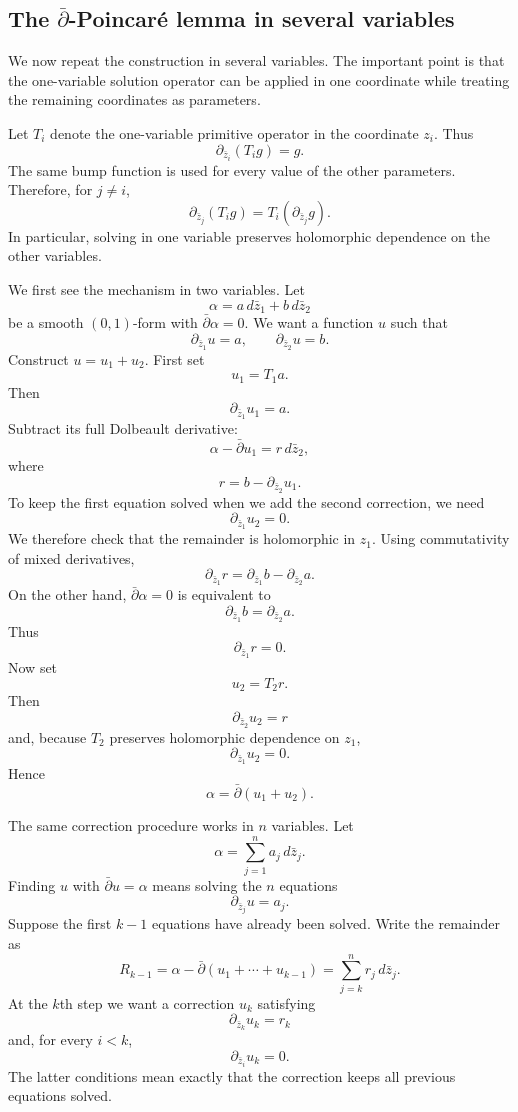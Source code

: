 \subsection{The $\bar\partial$-Poincaré lemma
in
several variables}
\label{subsection-dbar-poincare-several-variables}

\medskip\noindent
We now repeat the construction in several
variables. The important point is that the
one-variable solution operator can be
applied in one coordinate while treating
the remaining coordinates as parameters.

Let $T_i$ denote the one-variable primitive
operator in the coordinate $z_i$. Thus
$$
\partial_{\bar z_i}(T_i g)=g.
$$
The same bump function is used for every
value of the other parameters. Therefore,
for $j\neq i$,
$$
\partial_{\bar z_j}(T_i g)
=
T_i(\partial_{\bar z_j}g).
$$
In particular, solving in one variable
preserves holomorphic dependence on the
other variables.

We first see the mechanism in two variables.
Let
$$
\alpha
=
a\,d\bar z_1+b\,d\bar z_2
$$
be a smooth $(0,1)$-form with
$\bar\partial\alpha=0$. We want a function
$u$ such that
$$
\partial_{\bar z_1}u=a,
\qquad
\partial_{\bar z_2}u=b.
$$
Construct $u=u_1+u_2$. First set
$$
u_1=T_1a.
$$
Then
$$
\partial_{\bar z_1}u_1=a.
$$
Subtract its full Dolbeault derivative:
$$
\alpha-\bar\partial u_1
=
r\,d\bar z_2,
$$
where
$$
r
=
b-\partial_{\bar z_2}u_1.
$$
To keep the first equation solved when we
add the second correction, we need
$$
\partial_{\bar z_1}u_2=0.
$$
We therefore check that the remainder is
holomorphic in $z_1$. Using commutativity of
mixed derivatives,
$$
\partial_{\bar z_1}r
=
\partial_{\bar z_1}b
-
\partial_{\bar z_2}a.
$$
On the other hand,
$\bar\partial\alpha=0$ is equivalent to
$$
\partial_{\bar z_1}b
=
\partial_{\bar z_2}a.
$$
Thus
$$
\partial_{\bar z_1}r=0.
$$
Now set
$$
u_2=T_2r.
$$
Then
$$
\partial_{\bar z_2}u_2=r
$$
and, because $T_2$ preserves holomorphic
dependence on $z_1$,
$$
\partial_{\bar z_1}u_2=0.
$$
Hence
$$
\alpha=\bar\partial(u_1+u_2).
$$

The same correction procedure works in
$n$ variables. Let
$$
\alpha
=
\sum_{j=1}^n a_j\,d\bar z_j.
$$
Finding $u$ with
$\bar\partial u=\alpha$ means solving the
$n$ equations
$$
\partial_{\bar z_j}u=a_j.
$$
Suppose the first $k-1$ equations have
already been solved. Write the remainder as
$$
R_{k-1}
=
\alpha
-
\bar\partial
(u_1+\cdots+u_{k-1})
=
\sum_{j=k}^n
r_j\,d\bar z_j.
$$
At the $k$th step we want a correction
$u_k$ satisfying
$$
\partial_{\bar z_k}u_k=r_k
$$
and, for every $i<k$,
$$
\partial_{\bar z_i}u_k=0.
$$
The latter conditions mean exactly that the
correction keeps all previous equations
solved.

